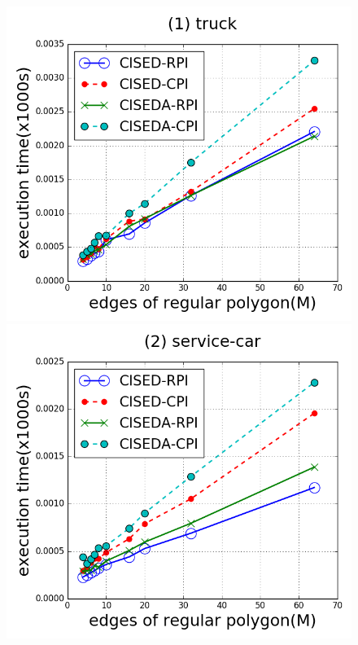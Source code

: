 \begin{figure}[tb!]
\centering
\includegraphics[scale = 0.250]{figures/Exp-M-e-20-time-truck.png}
\includegraphics[scale = 0.250]{figures/Exp-M-e-20-time-service.png}

\end{figure}

